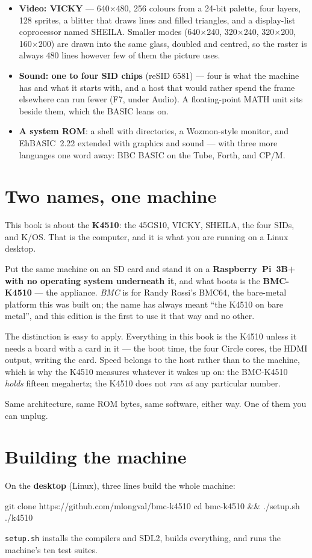 \begin{itemize}[leftmargin=1.4em]
\item \textbf{Video: VICKY} --- 640$\times$480, 256 colours from a 24-bit
  palette, four layers, 128 sprites, a blitter that draws lines and filled
  triangles, and a display-list coprocessor named SHEILA. Smaller modes
  (640$\times$240, 320$\times$240, 320$\times$200, 160$\times$200) are
  drawn into the same glass, doubled and centred, so the raster is always
  480 lines however few of them the picture uses.
\item \textbf{Sound: one to four SID chips} (reSID 6581) --- four is what
  the machine has and what it starts with, and a host that would rather
  spend the frame elsewhere can run fewer (F7, under Audio). A
  floating-point MATH unit sits beside them, which the BASIC leans on.
\item \textbf{A system ROM}: a shell with directories, a Wozmon-style
  monitor, and EhBASIC~2.22 extended with graphics and sound --- with three
  more languages one word away: BBC BASIC on the Tube, Forth, and CP/M.
\end{itemize}

\section{Two names, one machine}\label{sec:names}
This book is about the \textbf{K4510}: the 45GS10, VICKY, SHEILA, the
four SIDs, and K/OS. That is the computer, and it is what you are running
on a Linux desktop.

Put the same machine on an SD card and stand it on a
\textbf{Raspberry~Pi~3B+ with no operating system underneath it}, and
what boots is the \textbf{BMC-K4510} --- the appliance. \emph{BMC} is
for Randy Rossi's BMC64, the bare-metal platform this was built on; the
name has always meant ``the K4510 on bare metal'', and this edition is
the first to use it that way and no other.

The distinction is easy to apply. Everything in this book is the K4510
unless it needs a board with a card in it --- the boot time, the four
Circle cores, the HDMI output, writing the card. Speed belongs to the
host rather than to the machine, which is why the K4510 measures whatever
it wakes up on: the BMC-K4510 \emph{holds} fifteen megahertz; the K4510
does not \emph{run at} any particular number.

Same architecture, same ROM bytes, same software, either way. One of them
you can unplug.

\section{Building the machine}
On the \textbf{desktop} (Linux), three lines build the whole machine:
\begin{type}
git clone https://github.com/mlongval/bmc-k4510
cd bmc-k4510 && ./setup.sh
./k4510
\end{type}
\verb|setup.sh| installs the compilers and SDL2, builds everything, and
runs the machine's ten test suites.

